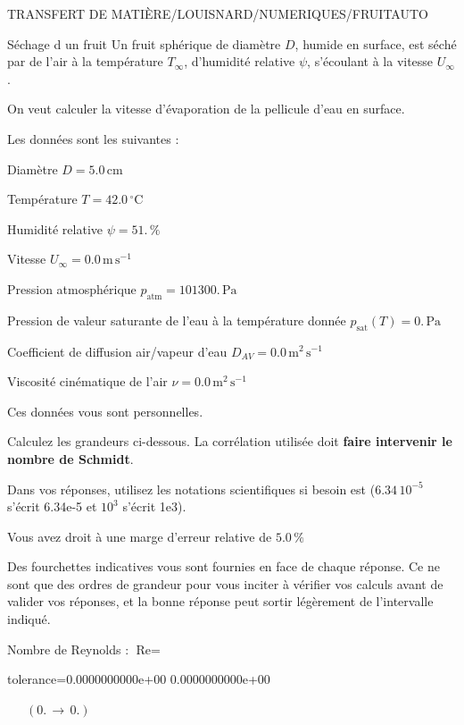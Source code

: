 \documentclass[12pt]{article}
\begin{document}
\begin{quiz}{TRANSFERT DE MATIÈRE/LOUISNARD/NUMERIQUES/FRUITAUTO} 

 \begin{cloze}{Séchage d un fruit} 
Un fruit sphérique de diamètre $D$, humide en surface, est séché par de l'air à la température $T_\infty$, d'humidité relative $\psi$, s'écoulant à la vitesse $U_\infty$.

On veut calculer la vitesse d'évaporation de la pellicule d'eau en surface.

 

Les données sont les suivantes :

 

Diamètre $D = 5.0\,  \mathrm{cm} $

Température $T = 42.0\,  \mathrm{^\circ\mathrm{C}} $

Humidité relative $\psi = 51.\, \% $

Vitesse $U_\infty = 0.0\,  \mathrm{m}\,  \mathrm{s}^{-1} $

Pression atmosphérique $p_{\text{atm}} = 101300.\,  \mathrm{Pa} $

Pression de valeur saturante de l’eau à la température donnée $p_{\text{sat}}(T) = 0.\,  \mathrm{Pa} $

Coefficient de diffusion air/vapeur d’eau $D_{AV} = 0.0\,  \mathrm{m}^{2}\,  \mathrm{s}^{-1} $

Viscosité cinématique de l’air $\nu = 0.0\,  \mathrm{m}^{2}\,  \mathrm{s}^{-1} $

Ces données vous sont personnelles.

 

Calculez les grandeurs ci-dessous. La corrélation utilisée doit \textbf{faire intervenir le nombre de Schmidt}.

Dans vos réponses, utilisez les notations scientifiques si besoin est ($6.34\, 10^{-5}$ s'écrit 6.34e-5 et $10^{3}$ s'écrit 1e3).

Vous avez droit à une marge d'erreur relative de $5.0\, \% $

Des fourchettes indicatives vous sont fournies en face de chaque réponse. Ce ne sont que des ordres de grandeur pour vous inciter à vérifier vos calculs avant de valider vos réponses, et la bonne réponse peut sortir légèrement de l'intervalle indiqué.

 

Nombre de Reynolds : $\text{Re} =  $
\begin{numerical}[points=1] 
\item[tolerance={0.0000000000e+00}] 0.0000000000e+00 
\end{numerical} 
 $\,$ 
 $ \quad (0. \, \rightarrow \, 0.) $ 


\end{cloze}
\end{quiz}
\end{document}

